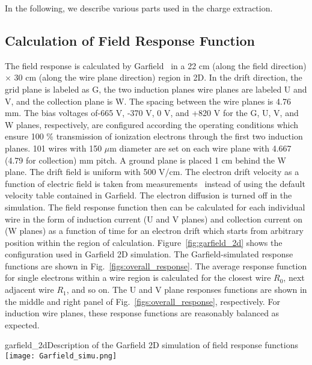 In the following, we describe various parts used in the charge extraction.

\subsection{Calculation of Field Response Function}

The field response is calculated by Garfield~\cite{garfield} in a 22 cm (along the 
field direction) $\times$ 30 cm (along the wire plane direction) region in 2D.  
In the drift direction, the grid plane is labeled as G, the two induction planes wire 
planes are labeled U and V, and the collection plane is W.  The spacing between the wire 
planes is 4.76 mm. The bias voltages of-665 V, -370 V, 0 V, and +820 V for the G, U, V, and 
W planes, respectively, are configured according the operating conditions which ensure 100 \%
    transmission of ionization electrons through the first two induction planes.  
    101 wires with 150 $\mu$m diameter are set on each wire plane with 4.667 (4.79 for collection) mm
    pitch.  A ground plane is placed 1 cm behind the W plane.  The drift
    field is uniform with 500 V/cm. The electron drift velocity as a function of
    electric field is taken from measurements~\cite{Li:2015rqa,lar_property}
    instead of using the default velocity table contained in Garfield. The electron
    diffusion is turned off in the simulation. The field response function then can
    be calculated for each individual wire in the form of induction current 
    (U and V planes) and collection current on (W planes) as a function of time for
    an electron drift which starts from arbitrary position within the region of calculation.
    Figure~\ref{fig:garfield_2d} shows the configuration used in Garfield 2D simulation.
The Garfield-simulated response functions are shown in Fig.~\ref{figs:overall_response}.
 The average response function for single electrons within a wire region 
is calculated for the closest wire $R_0$, next adjacent wire $R_1$, and so on. The U and 
V plane responses functions are shown in the middle and right panel of 
Fig.~\ref{figs:overall_response}, respectively.  For induction wire planes, these response 
functions are reasonably balanced as expected.


\begin{cdrfigure}{garfield_2d}{Description of the Garfield 2D simulation of field response functions}
  \texttt{[image: Garfield\_simu.png]}
\end{cdrfigure}


